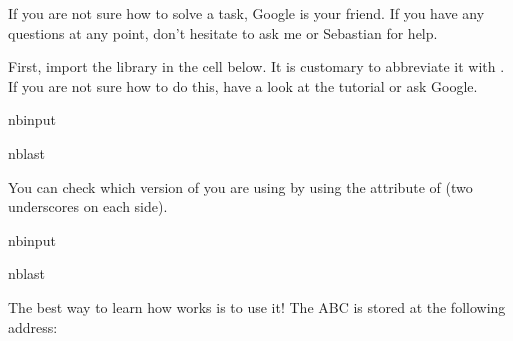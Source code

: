 \documentclass[letterpaper,10pt,english]{sphinxmanual}
\begin{document}
\sphinxAtStartPar
If you are not sure how to solve a task, Google is your friend. If you have any questions at any point, don’t hesitate to ask me or Sebastian for help.

\sphinxAtStartPar
First, import the  library in the cell below. It is customary to abbreviate it with . If you are not sure how to do this, have a look at the  tutorial or ask Google.

\begin{sphinxuseclass}{nbinput}
\begin{sphinxuseclass}{nblast}
{
\begin{sphinxVerbatim}[commandchars=\\\{\}]
\llap{\color{nbsphinxin}[1]:\,\hspace{\fboxrule}\hspace{\fboxsep}}   
\end{sphinxVerbatim}
}

\end{sphinxuseclass}
\end{sphinxuseclass}
\sphinxAtStartPar
You can check which version of  you are using by using the  attribute of (two underscores on each side).

\begin{sphinxuseclass}{nbinput}
\begin{sphinxuseclass}{nblast}
{
\begin{sphinxVerbatim}[commandchars=\\\{\}]
\llap{\color{nbsphinxin}[ ]:\,\hspace{\fboxrule}\hspace{\fboxsep}}
\end{sphinxVerbatim}
}

\end{sphinxuseclass}
\end{sphinxuseclass}
\sphinxAtStartPar
The best way to learn how  works is to use it! The ABC is stored at the following address:
\end{document}
